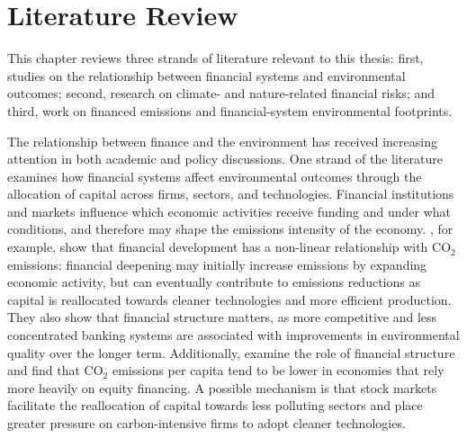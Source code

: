 
\chapter{Literature Review} %

\label{Chapter2} %
This chapter reviews three strands of literature relevant to this thesis: first, studies on the relationship between financial systems and environmental outcomes; second, research on climate- and nature-related financial risks; and third, work on financed emissions and financial-system environmental footprints.


The relationship between finance and the environment has received increasing attention in both academic and policy discussions. One strand of the literature examines how financial systems affect environmental outcomes through the allocation of capital across firms, sectors, and technologies. Financial institutions and markets influence which economic activities receive funding and under what conditions, and therefore may shape the emissions intensity of the economy. \textcite{kim_carbon_2020}, for example, show that financial development has a non-linear relationship with CO$_2$ emissions: financial deepening may initially increase emissions by expanding economic activity, but can eventually contribute to emissions reductions as capital is reallocated towards cleaner technologies and more efficient production. They also show that financial structure matters, as more competitive and less concentrated banking systems are associated with improvements in environmental quality over the longer term. Additionally, \textcite{ecb_finance_2019} examine the role of financial structure and find that CO$_2$ emissions per capita tend to be lower in economies that rely more heavily on equity financing. A possible mechanism is that stock markets facilitate the reallocation of capital towards less polluting sectors and place greater pressure on carbon-intensive firms to adopt cleaner technologies.

